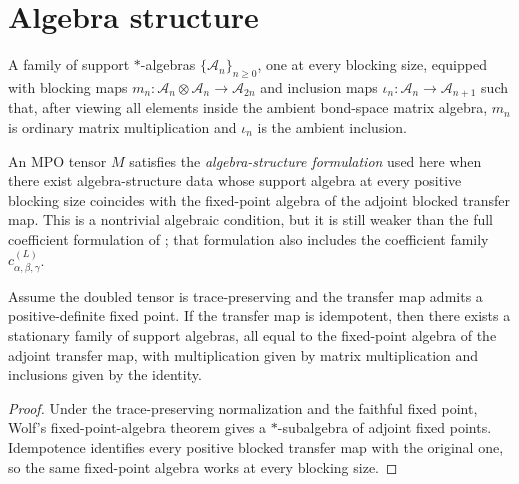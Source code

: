 \section{Algebra structure}

\begin{definition}%
    \label{def:mpdo_algebra_structure_data}
    \leanok
    A family of support $*$-algebras $\{\mathcal{A}_n\}_{n \ge 0}$, one at
    every blocking size, equipped with blocking maps
    $m_n : \mathcal{A}_n \otimes \mathcal{A}_n \to \mathcal{A}_{2n}$ and
    inclusion maps $\iota_n : \mathcal{A}_n \to \mathcal{A}_{n+1}$ such that,
    after viewing all elements inside the ambient bond-space matrix algebra,
    $m_n$ is ordinary matrix multiplication and $\iota_n$ is the ambient
    inclusion.
\end{definition}

\begin{definition}%
    \label{def:mpdo_rfp_via_algebra}
    \leanok
    An MPO tensor $M$ satisfies the \emph{algebra-structure formulation} used
    here when there exist algebra-structure data whose support algebra at every
    positive blocking size coincides with the fixed-point algebra of the adjoint
    blocked transfer map. This is a nontrivial algebraic condition, but it is still
    weaker than the full coefficient formulation of
    \cite[Theorem~4.14(ii)]{Cirac2016MPDO_arXiv}; that formulation also
    includes the coefficient family $c_{\alpha,\beta,\gamma}^{(L)}$.
\end{definition}

\begin{theorem}%
    \label{thm:mpdo_rfp_via_algebra_from_rfp}
    \leanok
    Assume the doubled tensor is trace-preserving and the transfer map admits a
    positive-definite fixed point. If the transfer map is idempotent, then there
    exists a stationary family of support algebras, all equal to the fixed-point
    algebra of the adjoint transfer map, with multiplication given by matrix
    multiplication and inclusions given by the identity.
\end{theorem}
\begin{proof}\leanok
    Under the trace-preserving normalization and the faithful fixed point, Wolf's
    fixed-point-algebra theorem gives a $*$-subalgebra of adjoint fixed points.
    Idempotence identifies every positive blocked transfer map with the original
    one, so the same fixed-point algebra works at every blocking size.
\end{proof}

